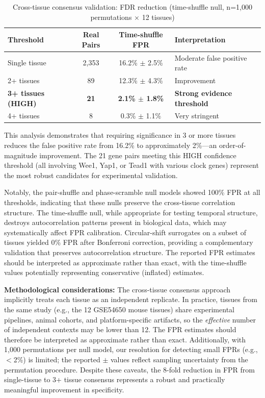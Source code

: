 \documentclass[11pt,a4paper]{article}
\begin{document}
\begin{table}[H]
\centering
\caption{Cross-tissue consensus validation: FDR reduction (time-shuffle null, n=1,000 permutations $\times$ 12 tissues)}
\label{tab:cross_tissue_fdr}
\begin{tabular}{lccl}
\toprule
Threshold & Real Pairs & Time-shuffle FPR & Interpretation \\
\midrule
Single tissue & 2,353 & 16.2\% $\pm$ 2.5\% & Moderate false positive rate \\
2+ tissues & 89 & 12.3\% $\pm$ 4.3\% & Improvement \\
\textbf{3+ tissues (HIGH)} & \textbf{21} & \textbf{2.1\% $\pm$ 1.8\%} & \textbf{Strong evidence threshold} \\
4+ tissues & 8 & 0.3\% $\pm$ 1.1\% & Very stringent \\
\bottomrule
\end{tabular}
\end{table}

This analysis demonstrates that requiring significance in 3 or more tissues reduces the false positive rate from 16.2\% to approximately 2\%---an order-of-magnitude improvement. The 21 gene pairs meeting this HIGH confidence threshold (all involving Wee1, Yap1, or Tead1 with various clock genes) represent the most robust candidates for experimental validation.

Notably, the pair-shuffle and phase-scramble null models showed 100\% FPR at all thresholds, indicating that these nulls preserve the cross-tissue correlation structure. The time-shuffle null, while appropriate for testing temporal structure, destroys autocorrelation patterns present in biological data, which may systematically affect FPR calibration. Circular-shift surrogates on a subset of tissues yielded 0\% FPR after Bonferroni correction, providing a complementary validation that preserves autocorrelation structure. The reported FPR estimates should be interpreted as approximate rather than exact, with the time-shuffle values potentially representing conservative (inflated) estimates.

\textbf{Methodological considerations:} The cross-tissue consensus approach implicitly treats each tissue as an independent replicate. In practice, tissues from the same study (e.g., the 12 GSE54650 mouse tissues) share experimental pipelines, animal cohorts, and platform-specific artifacts, so the \textit{effective} number of independent contexts may be lower than 12. The FPR estimates should therefore be interpreted as approximate rather than exact. Additionally, with 1,000 permutations per null model, our resolution for detecting small FPRs (e.g., $<$2\%) is limited; the reported $\pm$ values reflect sampling uncertainty from the permutation procedure. Despite these caveats, the 8-fold reduction in FPR from single-tissue to 3+ tissue consensus represents a robust and practically meaningful improvement in specificity.
\end{document}
